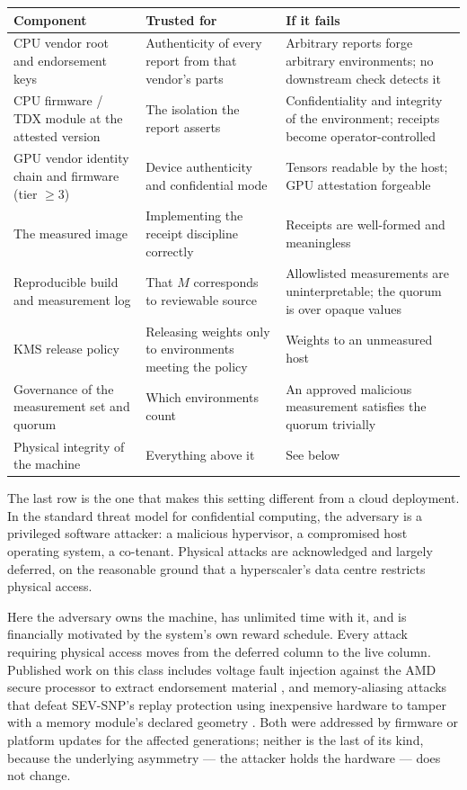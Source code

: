 \documentclass[11pt]{article}
\begin{document}
\begin{center}
\small
\begin{tabular}{@{}L{0.26\textwidth}L{0.36\textwidth}L{0.30\textwidth}@{}}
\toprule
Component & Trusted for & If it fails \\
\midrule
CPU vendor root and endorsement keys & Authenticity of every report from that vendor's parts &
Arbitrary reports forge arbitrary environments; no downstream check detects it \\
CPU firmware / TDX module at the attested version & The isolation the report asserts &
Confidentiality and integrity of the environment; receipts become operator-controlled \\
GPU vendor identity chain and firmware (tier $\geq 3$) & Device authenticity and confidential mode &
Tensors readable by the host; GPU attestation forgeable \\
The measured image & Implementing the receipt discipline correctly & Receipts are well-formed and
meaningless \\
Reproducible build and measurement log & That $M$ corresponds to reviewable source & Allowlisted
measurements are uninterpretable; the quorum is over opaque values \\
KMS release policy & Releasing weights only to environments meeting the policy & Weights to an
unmeasured host \\
Governance of the measurement set and quorum & Which environments count & An approved malicious
measurement satisfies the quorum trivially \\
Physical integrity of the machine & Everything above it & See below \\
\bottomrule
\end{tabular}
\end{center}

The last row is the one that makes this setting different from a cloud deployment. In the standard
threat model for confidential computing, the adversary is a privileged software attacker: a
malicious hypervisor, a compromised host operating system, a co-tenant. Physical attacks are
acknowledged and largely deferred, on the reasonable ground that a hyperscaler's data centre
restricts physical access.

Here the adversary owns the machine, has unlimited time with it, and is financially motivated by the
system's own reward schedule. Every attack requiring physical access moves from the deferred column
to the live column. Published work on this class includes voltage fault injection against the AMD
secure processor to extract endorsement material \cite{buhren2021}, and memory-aliasing attacks that
defeat SEV-SNP's replay protection using inexpensive hardware to tamper with a memory module's
declared geometry \cite{badram}. Both were addressed by firmware or platform updates for the
affected generations; neither is the last of its kind, because the underlying asymmetry --- the
attacker holds the hardware --- does not change.
\end{document}
